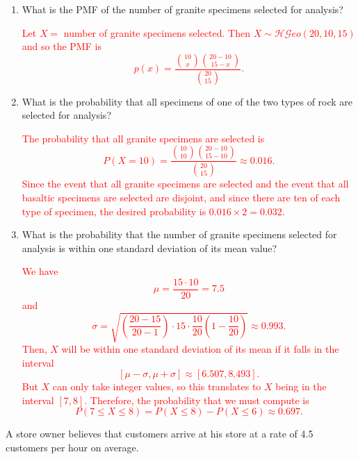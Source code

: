\documentclass[12pt,reqno]{amsart}
\begin{document}
\medskip
\begin{enumerate}
\item What is the PMF of the number of granite specimens selected for analysis?

\bigskip
\textcolor{red}{Let $X=$ number of granite specimens selected. Then $X\sim \mathcal{HG}eo(20, 10, 15)$ and so the PMF is
	\[p(x) = \frac{\binom{10}{x} \binom{20-10}{15-x}}{\binom{20}{15}}.
	\]}
\bigskip

\item What is the probability that all specimens of one of the two types of rock are selected for analysis?

\bigskip
\textcolor{red}{The probability that all granite specimens are selected is
	\[P(X=10) = \frac{\binom{10}{10} \binom{20-10}{15-10}}{\binom{20}{15}} \approx 0.016.
	\]
Since the event that all granite specimens are selected and the event that all basaltic specimens are selected are disjoint, and since there are ten of each type of specimen, the desired probability is $0.016 \times 2 = 0.032$.}
\bigskip

\item What is the probability that the number of granite specimens selected for analysis is within one standard deviation of its mean value?

\bigskip
\textcolor{red}{We have
	\[\mu = \frac{15\cdot 10}{20}=7.5
	\]
and
	\[\sigma = \sqrt{\left(\frac{20-15}{20-1}\right) \cdot 15 \cdot \frac{10}{20} \left(1- \frac{10}{20} \right)} \approx 0.993.
	\]
Then, $X$ will be within one standard deviation of its mean if it falls in the interval
	\[[\mu-\sigma, \mu + \sigma] \approx [6.507, 8.493].
	\]
But $X$ can only take integer values, so this translates to $X$ being in the interval $[7,8]$. Therefore, the probability that we must compute is
	\[P(7 \leq X \leq 8) = P(X \leq 8) - P(X \leq 6) \approx 0.697.
	\]}
\end{enumerate}


















\bigskip
\prob A store owner believes that customers arrive at his store at a rate of 4.5 customers per hour on average.
\end{document}
